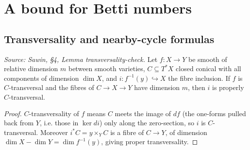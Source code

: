 \section{A bound for Betti numbers}

\subsection{Transversality and nearby-cycle formulas}

\begin{lemma}
  \label{lem:sawin_transversality_check}
  \textit{Source: Sawin, §4, Lemma transversality-check.}
  Let $f:X\to Y$ be smooth of relative dimension $m$ between smooth varieties,
  $C\subseteq T^*X$ closed conical with all components of dimension $\dim X$, and
  $i:f^{-1}(y)\hookrightarrow X$ the fibre inclusion.  If $f$ is $C$-transversal
  and the fibres of $C\to X\to Y$ have dimension $m$, then $i$ is properly
  $C$-transversal.
\end{lemma}
\begin{proof}
  $C$-transversality of $f$ means $C$ meets the image of $df$ (the one-forms
  pulled back from $Y$, i.e. those in $\ker di$) only along the zero-section, so
  $i$ is $C$-transversal.  Moreover $i^*C = y\times_Y C$ is a fibre of $C\to Y$,
  of dimension $\dim X-\dim Y = \dim f^{-1}(y)$, giving proper transversality.
\end{proof}

